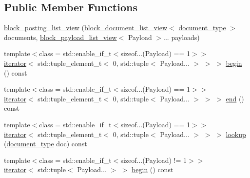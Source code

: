 \subsection*{Public Member Functions}
\begin{DoxyCompactItemize}
\item 
\mbox{\hyperlink{classirk_1_1index_1_1block__posting__list__view_a09936613ed78d60fc695429ab4315d24}{block\+\_\+posting\+\_\+list\+\_\+view}} (\mbox{\hyperlink{classirk_1_1index_1_1block__document__list__view}{block\+\_\+document\+\_\+list\+\_\+view}}$<$ \mbox{\hyperlink{classirk_1_1index_1_1block__posting__list__view_a4a778116d22c9cf347f38da132ca0900}{document\+\_\+type}} $>$ documents, \mbox{\hyperlink{classirk_1_1index_1_1block__payload__list__view}{block\+\_\+payload\+\_\+list\+\_\+view}}$<$ Payload $>$... payloads)
\item 
{\footnotesize template$<$class  = std\+::enable\+\_\+if\+\_\+t$<$sizeof...(\+Payload) == 1$>$$>$ }\\\mbox{\hyperlink{classirk_1_1index_1_1block__posting__list__view_1_1iterator}{iterator}}$<$ std\+::tuple\+\_\+element\+\_\+t$<$ 0, std\+::tuple$<$ Payload... $>$ $>$ $>$ \mbox{\hyperlink{classirk_1_1index_1_1block__posting__list__view_a47c5ede6a59868de82629e8cab826cf0}{begin}} () const
\item 
{\footnotesize template$<$class  = std\+::enable\+\_\+if\+\_\+t$<$sizeof...(\+Payload) == 1$>$$>$ }\\\mbox{\hyperlink{classirk_1_1index_1_1block__posting__list__view_1_1iterator}{iterator}}$<$ std\+::tuple\+\_\+element\+\_\+t$<$ 0, std\+::tuple$<$ Payload... $>$ $>$ $>$ \mbox{\hyperlink{classirk_1_1index_1_1block__posting__list__view_a22d74833bc37a7f8e4fd1541663dc40d}{end}} () const
\item 
{\footnotesize template$<$class  = std\+::enable\+\_\+if\+\_\+t$<$sizeof...(\+Payload) == 1$>$$>$ }\\\mbox{\hyperlink{classirk_1_1index_1_1block__posting__list__view_1_1iterator}{iterator}}$<$ std\+::tuple\+\_\+element\+\_\+t$<$ 0, std\+::tuple$<$ Payload... $>$ $>$ $>$ \mbox{\hyperlink{classirk_1_1index_1_1block__posting__list__view_a0b62cb7c0c729c187b6591ba6a667721}{lookup}} (\mbox{\hyperlink{classirk_1_1index_1_1block__posting__list__view_a4a778116d22c9cf347f38da132ca0900}{document\+\_\+type}} doc) const
\item 
{\footnotesize template$<$class  = std\+::enable\+\_\+if\+\_\+t$<$sizeof...(\+Payload) != 1$>$$>$ }\\\mbox{\hyperlink{classirk_1_1index_1_1block__posting__list__view_1_1iterator}{iterator}}$<$ std\+::tuple$<$ Payload... $>$ $>$ \mbox{\hyperlink{classirk_1_1index_1_1block__posting__list__view_a4b5c29ebc678f45016e27083855d1d96}{begin}} () const

\end{DoxyCompactItemize}
